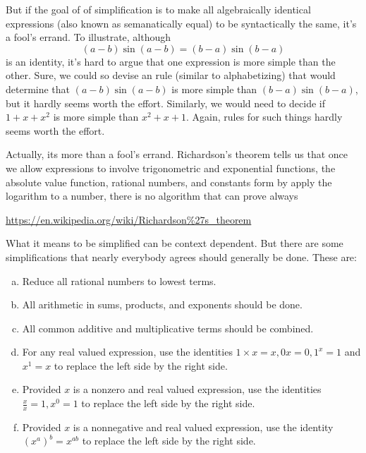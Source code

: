 \documentclass[12pt,fleqn]{article}
\newenvironment{alphalist}{
  \begin{enumerate}[(a)]
    \addtolength{\itemsep}{-0.5\itemsep}}
  {\end{enumerate}}
\begin{document}
{But if the goal of of simplification is to make all algebraically
identical expressions (also known as semanatically equal) to be syntactically the same, it's a fool's 
errand. To illustrate, although
\begin{equation}
    (a-b) \sin(a-b) = (b-a) \sin(b-a)
\end{equation}
is an identity, it's hard to argue that one expression is more simple than
the other. Sure, we could so devise an rule (similar to alphabetizing) that
would determine that \((a-b) \sin(a-b)\) is more simple than \((b-a) \sin(b-a)\),
but it hardly seems worth the effort. Similarly, we would need to decide
if \(1+x+x^2\) is more simple than \(x^2 + x + 1\). Again, rules for
such things hardly seems worth the effort.

Actually, its more than a fool's errand. Richardson's theorem tells us
that once we allow expressions to involve trigonometric and exponential 
functions, the absolute value function, rational numbers, and constants form by apply the logarithm
to a number, there is no algorithm that can prove always

\url{https://en.wikipedia.org/wiki/Richardson%27s_theorem}


What it means to be 
simplified can be context dependent. But there are some simplifications that nearly 
everybody agrees should generally be done. These are:

\begin{tcolorbox}
\begin{alphalist}

\item  Reduce all rational numbers to lowest terms.

\item All arithmetic in sums, products, and exponents should be done.

\item All common additive and multiplicative terms should be combined.

\item For any real valued expression, use the identities  $1 \times x   = x ,  0  x = 0, 1^x = 1$ and  $x^1 =x$ to replace the left side by the right side.

\item Provided $x$ is a nonzero and real valued expression,  use the identities $\frac{x}{x} = 1, x^0 = 1$ to replace the left side by the right side.

\item Provided $x$ is a nonnegative and real valued expression, use the identity $\left(x^a\right)^b = x^{a b}$  to replace the left side by the right side.


\end{alphalist}
\end{tcolorbox}}
\end{document}
